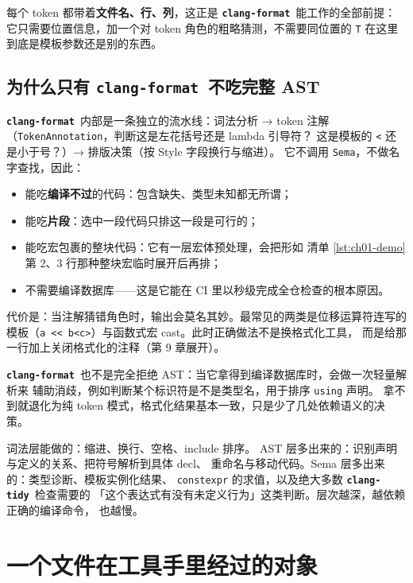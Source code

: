 \documentclass[12pt,a4paper,fontset=fandol]{ctexbook}
\newcommand{\Tp}[1]{\texttt{#1}}
\newcommand{\Lib}[1]{\textbf{\texttt{#1}}}
\newcommand{\Tidy}{\Lib{clang-tidy}}
\newcommand{\Fmt}{\Lib{clang-format}}
\begin{document}
每个 token 都带着\textbf{文件名、行、列}，这正是 \Fmt\ 能工作的全部前提：
它只需要位置信息，加一个对 token 角色的粗略猜测，不需要同位置的 \Tp{T}
在这里到底是模板参数还是别的东西。

\subsection*{为什么只有 \Fmt\ 不吃完整 AST}

\Fmt\ 内部是一条独立的流水线：词法分析 → token 注解
（\texttt{Token\allowbreak Annotation}，判断这是左花括号还是 lambda 引导符？
这是模板的 \texttt{<} 还是小于号？）→ 排版决策（按 Style 字段换行与缩进）。
它不调用 \texttt{Sema}，不做名字查找，因此：

\begin{itemize}
  \item 能吃\textbf{编译不过}的代码：包含缺失、类型未知都无所谓；
  \item 能吃\textbf{片段}：选中一段代码只排这一段是可行的；
  \item 能吃宏包裹的整块代码：它有一层宏体预处理，会把形如
        清单 \ref{lst:ch01-demo} 第 2、3 行那种整块宏临时展开后再排；
  \item 不需要编译数据库——这是它能在 CI 里以秒级完成全仓检查的根本原因。
\end{itemize}

代价是：当注解猜错角色时，输出会莫名其妙。最常见的两类是位移运算符连写的
模板（\texttt{a << b<{}c>}）与函数式宏 cast。此时正确做法不是换格式化工具，
而是给那一行加上关闭格式化的注释（第 9 章展开）。

\Fmt\ 也不是完全拒绝 AST：当它拿得到编译数据库时，会做一次轻量解析来
辅助消歧，例如判断某个标识符是不是类型名，用于排序 \texttt{using} 声明。
拿不到就退化为纯 token 模式，格式化结果基本一致，只是少了几处依赖语义的决策。

\begin{guideline}[title={哪些能力属于哪一层}]
词法层能做的：缩进、换行、空格、include 排序。
AST 层多出来的：识别声明与定义的关系、把符号解析到具体 decl、
重命名与移动代码。Sema 层多出来的：类型诊断、模板实例化结果、
\texttt{constexpr} 的求值，以及绝大多数 \Tidy\ 检查需要的
「这个表达式有没有未定义行为」这类判断。层次越深，越依赖正确的编译命令，
也越慢。
\end{guideline}

\section{一个文件在工具手里经过的对象}
\label{sec:ch01-s2}
\end{document}
